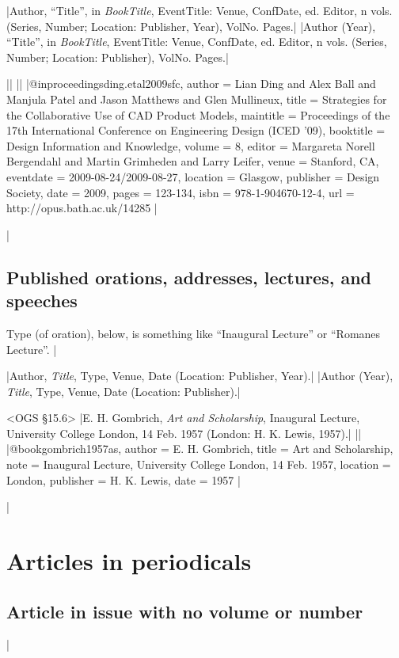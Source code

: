 \documentclass[extrafontsizes,11pt,a4paper,oneside]{memoir}
\newcommand*{\lit}[1]{\textsf{#1}}
\begin{document}
\specs
|Author, \enquote{Title}, \lit{in} \emph{BookTitle}, EventTitle: Venue, ConfDate, \lit{ed.} Editor, n \lit{vols.} (Series, Number; Location: Publisher, Year), VolNo. Pages.|%
|Author (Year), \enquote{Title}, \lit{in} \emph{BookTitle}, EventTitle: Venue, ConfDate, \lit{ed.} Editor, n \lit{vols.} (Series, Number; Location: Publisher), VolNo. Pages.|

\bibexample
||%
||%
|@inproceedings{ding.etal2009sfc,
  author = {Lian Ding and Alex Ball and Manjula Patel and Jason Matthews and Glen Mullineux},
  title = {Strategies for the Collaborative Use of CAD Product Models},
  maintitle = {Proceedings of the 17th International Conference on Engineering Design (ICED ’09)},
  booktitle = {Design Information and Knowledge},
  volume = {8},
  editor = {Margareta Norell Bergendahl and Martin Grimheden and Larry Leifer},
  venue = {Stanford, CA},
  eventdate = {2009-08-24/2009-08-27},
  location = {Glasgow},
  publisher = {Design Society},
  date = {2009},
  pages = {123-134},
  isbn = {978-1-904670-12-4},
  url = {http://opus.bath.ac.uk/14285}
}|

\todoc|
\section{Published orations, addresses, lectures, and speeches}

Type (of oration), below, is something like \enquote{Inaugural Lecture} or \enquote{Romanes Lecture}.
|

\specs
|Author, \emph{Title}, Type, Venue, Date (Location: Publisher, Year).|%
|Author (Year), \emph{Title}, Type, Venue, Date (Location: Publisher).|

\bibexample<OGS \S15.6>
|E. H. Gombrich, \emph{Art and Scholarship}, Inaugural Lecture, University College London, 14 Feb. 1957 (London: H. K. Lewis, 1957).|%
||%
|@book{gombrich1957as,
  author = {E. H. Gombrich},
  title = {Art and Scholarship},
  note = {Inaugural Lecture, University College London, 14 Feb. 1957},
  location = {London},
  publisher = {H. K. Lewis},
  date = {1957}
}|

\todoc|
\chapter{Articles in periodicals}\label{sec:article}

\section{Article in issue with no volume or number}
|
\end{document}
